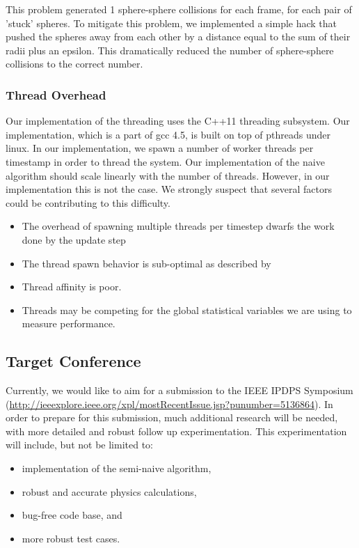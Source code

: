 \documentclass[conference]{IEEEtran}
\begin{document}
This problem generated 1 sphere-sphere collisions for each frame, for each pair of 'stuck' spheres.  To mitigate this problem, we implemented a simple hack that pushed the spheres away from each other by a distance equal to the sum of their radii plus an epsilon.
This dramatically reduced the number of sphere-sphere collisions to the correct number.

\subsubsection{Thread Overhead}
	Our implementation of the threading uses the C++11 threading subsystem.  Our implementation, which is a part of gcc 4.5, is built on top of pthreads under linux.  In our implementation, we 
spawn a number of worker threads per timestamp in order to thread the system.  Our implementation of the naive algorithm should scale linearly with the number of threads.  However, in our implementation this is not the case.  We strongly suspect that
several factors could be contributing to this difficulty.  

\begin{itemize}
	\item The overhead of spawning multiple threads per timestep dwarfs the work done by the update step
	\item The thread spawn behavior is sub-optimal as described by \cite{performance-critical}
	\item Thread affinity is poor.
	\item Threads may be competing for the global statistical variables we are using to measure performance.
\end{itemize}

\subsection{Target Conference}
Currently, we would like to aim for a submission to the IEEE IPDPS Symposium (\url{http://ieeexplore.ieee.org/xpl/mostRecentIssue.jsp?punumber=5136864}).  In order to prepare for this submission, much additional research will be needed, with more detailed and robust follow up experimentation.  This experimentation will include, but not be limited to:
\begin{itemize}
\item implementation of the semi-naive algorithm,
\item robust and accurate physics calculations,
\item bug-free code base, and
\item more robust test cases.
\end{itemize}
\end{document}
